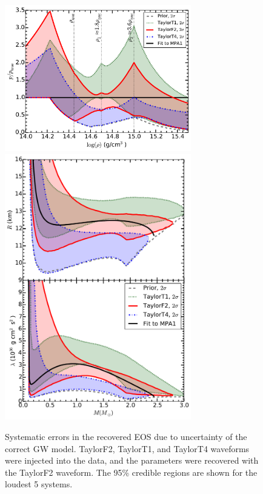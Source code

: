 \documentclass[twocolumn,prd,amssymb,aps,nofootinbib,showpacs,epsf]{revtex4}
\begin{document}
\begin{figure}[!htb]
\begin{center}
\includegraphics[width=3.2in]{LALMCMCmpa1FitCompareF2T1T4ZeroNoiseperror.pdf}\\
\includegraphics[width=3.2in]{LALMCMCmpa1FitCompareF2T1T4ZeroNoiseRadiuslambda.pdf}
\caption{Systematic errors in the recovered EOS due to uncertainty of the correct GW model. TaylorF2, TaylorT1, and TaylorT4 waveforms were injected into the data, and the parameters were recovered with the TaylorF2 waveform. The 95\% credible regions are shown for the loudest 5 systems.}
\label{fig:systematic}
\end{center}
\end{figure}
\end{document}
